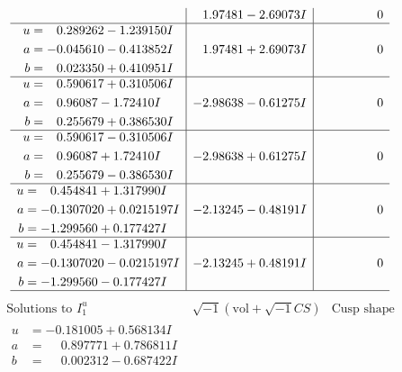 \documentclass[1p]{elsarticle_modified}
\theoremstyle{definition}
\newcommand{\I}{\sqrt{-1}}
\begin{document}
$$\begin{array}{c|c|c}
 & \phantom{-}1.97481 - 2.69073 I & \phantom{-0.000000 } 0 \\ \hline\begin{aligned}
u &= \phantom{-}0.289262 - 1.239150 I \\
a &= -0.045610 - 0.413852 I \\
b &= \phantom{-}0.023350 + 0.410951 I\end{aligned}
 & \phantom{-}1.97481 + 2.69073 I & \phantom{-0.000000 } 0 \\ \hline\begin{aligned}
u &= \phantom{-}0.590617 + 0.310506 I \\
a &= \phantom{-}0.96087 - 1.72410 I \\
b &= \phantom{-}0.255679 + 0.386530 I\end{aligned}
 & -2.98638 - 0.61275 I & \phantom{-0.000000 } 0 \\ \hline\begin{aligned}
u &= \phantom{-}0.590617 - 0.310506 I \\
a &= \phantom{-}0.96087 + 1.72410 I \\
b &= \phantom{-}0.255679 - 0.386530 I\end{aligned}
 & -2.98638 + 0.61275 I & \phantom{-0.000000 } 0 \\ \hline\begin{aligned}
u &= \phantom{-}0.454841 + 1.317990 I \\
a &= -0.1307020 + 0.0215197 I \\
b &= -1.299560 + 0.177427 I\end{aligned}
 & -2.13245 - 0.48191 I & \phantom{-0.000000 } 0 \\ \hline\begin{aligned}
u &= \phantom{-}0.454841 - 1.317990 I \\
a &= -0.1307020 - 0.0215197 I \\
b &= -1.299560 - 0.177427 I\end{aligned}
 & -2.13245 + 0.48191 I & \phantom{-0.000000 } 0\\
 \hline 
 \end{array}$$\newpage$$\begin{array}{c|c|c}  
\text{Solutions to }I^u_{1}& \I (\text{vol} + \sqrt{-1}CS) & \text{Cusp shape}\\
 \hline 
\begin{aligned}
u &= -0.181005 + 0.568134 I \\
a &= \phantom{-}0.897771 + 0.786811 I \\
b &= \phantom{-}0.002312 - 0.687422 I\end{aligned}

\end{array}$$
\end{document}
